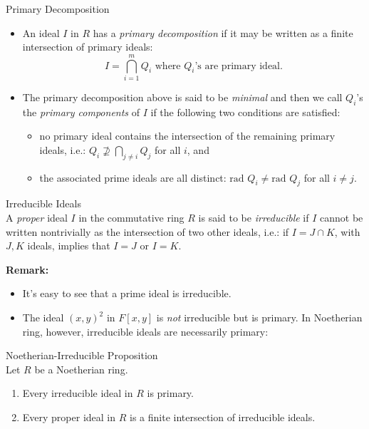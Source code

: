 \begin{definition}{Primary Decomposition}\\
\begin{itemize}
    \item An ideal $I$ in $R$ has a \textit{primary decomposition} if it may be written as a finite intersection of primary ideals:
    \[
    I= \bigcap_{i=1}^m Q_i \text{ where } Q_i \text{'s are primary ideal.}
    \]

    \item The primary decomposition above is said to be \textit{minimal} and then we call $Q_i$'s the \textit{primary components} of $I$ if the following two conditions are satisfied:
    \begin{itemize}
        \item no primary ideal contains the intersection of the remaining primary ideals, i.e.: $Q_i \not\supseteq \bigcap_{j\neq i}Q_j$ for all $i$, and

        \item the associated prime ideals are all distinct: $\text{rad } Q_i \neq \text{rad }Q_j$ for all $i\neq j$.
    \end{itemize}
\end{itemize}
\end{definition}

\begin{definition}{Irreducible Ideals}\\
A \textit{proper} ideal $I$ in the commutative ring $R$ is said to be \textit{irreducible} if $I$ cannot be written nontrivially as the intersection of two other ideals, i.e.: if $I= J\cap K$, with $J,K$ ideals, implies that $I=J$ or $I=K$.
\end{definition}

\noindent\textbf{Remark:} \begin{itemize}
    \item It's easy to see that a prime ideal is irreducible.
    \item The ideal $(x,y)^2$ in $F[x,y]$ is \textit{not} irreducible but is primary. In Noetherian ring, however, irreducible ideals are necessarily primary:
\end{itemize}

\begin{proposition}{Noetherian-Irreducible Proposition}\\
Let $R$ be a Noetherian ring.
\begin{enumerate}
    \item Every irreducible ideal in $R$ is primary.
    \item Every proper ideal in $R$ is a finite intersection of irreducible ideals.
\end{enumerate}
\end{proposition}

